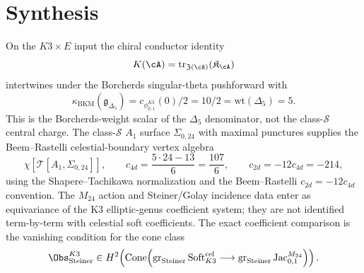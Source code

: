 \section{Synthesis}
\label{sec:thqgche-supplement}

\begin{remark}
\label{rem:thqgche-phi-trace}
On the $K3\times E$ input the chiral conductor identity
\[
K(\cA)=\mathrm{tr}_{\mathfrak Z(\cA)}(\mathfrak K_\cA)
\]
intertwines under the Borcherds singular-theta pushforward with
\[
\kappa_{\mathrm{BKM}}(\mathfrak g_{\Delta_5})
=c_{\phi_{0,1}^{K3}}(0)/2
=10/2
=\mathrm{wt}(\Delta_5)
=5.
\]
This is the Borcherds-weight scalar of the $\Delta_5$ denominator,
not the class-$\mathcal S$ central charge. The class-$\mathcal S$
$A_1$ surface $\Sigma_{0,24}$ with maximal punctures supplies the
Beem--Rastelli celestial-boundary vertex algebra
\[
\chi[\mathcal T[A_1,\Sigma_{0,24}]],
\qquad
c_{4d}=\frac{5\cdot 24-13}{6}=\frac{107}{6},
\qquad
c_{2d}=-12c_{4d}=-214,
\]
using the Shapere--Tachikawa normalization and the Beem--Rastelli
$c_{2d}=-12c_{4d}$ convention. The $M_{24}$ action and Steiner/Golay
incidence data enter as equivariance of the K3 elliptic-genus
coefficient system; they are not identified term-by-term with
celestial soft coefficients. The exact coefficient comparison is the
vanishing condition for the cone class
\[
\Obs^{K3}_{\mathrm{Steiner}}
\in
H^2\!\left(
\Cone\!\left(
\gr_{\mathrm{Steiner}}\mathrm{Soft}^{\mathrm{cel}}_{K3}
\longrightarrow
\gr_{\mathrm{Steiner}}\mathrm{Jac}_{0,1}^{M_{24}}
\right)\right).
\]
\end{remark}
